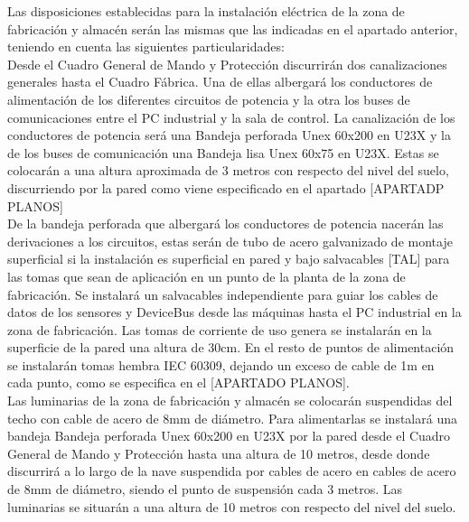 Las disposiciones establecidas para la instalación eléctrica de la zona de fabricación y almacén serán las mismas que las indicadas en el apartado anterior, teniendo en cuenta las siguientes particularidades:\\

Desde el Cuadro General de Mando y Protección discurrirán dos canalizaciones generales hasta el Cuadro Fábrica. Una de ellas albergará los conductores de alimentación de los diferentes circuitos de potencia y la otra los buses de comunicaciones entre el PC industrial y la sala de control. La canalización de los conductores de potencia será una Bandeja perforada Unex 60x200 en U23X y la de los buses de comunicación una Bandeja lisa Unex 60x75 en U23X. Estas se colocarán a una altura aproximada de 3 metros con respecto del nivel del suelo, discurriendo por la pared como viene especificado en el apartado [APARTADP PLANOS]\\

De la bandeja perforada que albergará los conductores de potencia nacerán las derivaciones a los circuitos, estas serán de tubo de acero galvanizado de montaje superficial si la instalación es superficial en pared y bajo salvacables [TAL] para las tomas que sean de aplicación en un punto de la planta de la zona de fabricación. Se instalará un salvacables independiente para guiar los cables de datos de los sensores y DeviceBus desde las máquinas hasta el PC industrial en la zona de fabricación. Las tomas de corriente de uso genera se instalarán en la superficie de la pared una altura de 30cm. En el resto de puntos de alimentación se instalarán tomas hembra IEC 60309, dejando un exceso de cable de 1m en cada punto, como se especifica en el [APARTADO PLANOS].\\

Las luminarias de la zona de fabricación y almacén se colocarán suspendidas del techo con cable de acero de 8mm de diámetro. Para alimentarlas se instalará una bandeja Bandeja perforada Unex 60x200 en U23X por la pared desde el Cuadro General de Mando y Protección hasta una altura de 10 metros, desde donde discurrirá a lo largo de la nave suspendida por cables de acero en cables de acero de 8mm de diámetro, siendo el punto de suspensión cada 3 metros. Las luminarias se situarán a una altura de 10 metros con respecto del nivel del suelo.

\newpage


	

